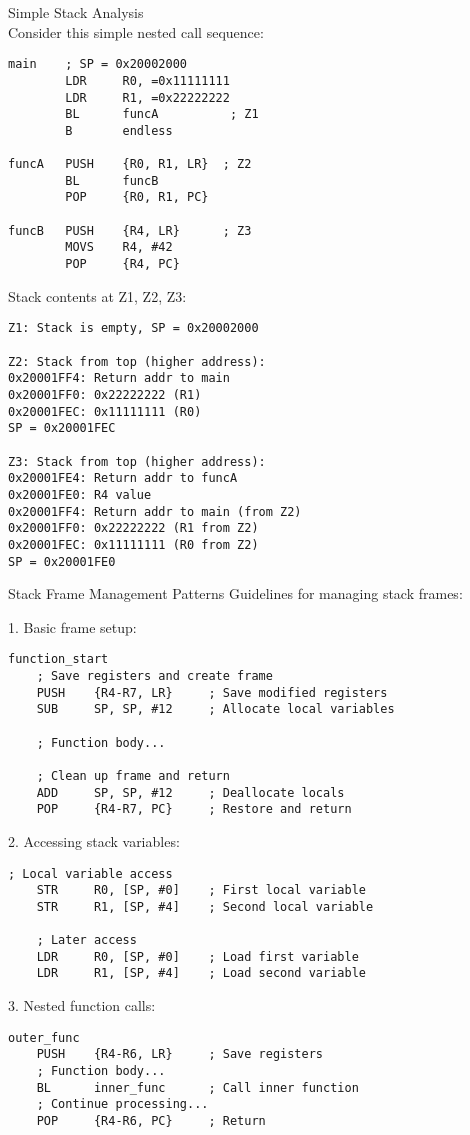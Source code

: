 \begin{example2}{Simple Stack Analysis}\\
Consider this simple nested call sequence:

\begin{lstlisting}[language=armasm, style=basesmol]
main    ; SP = 0x20002000
        LDR     R0, =0x11111111
        LDR     R1, =0x22222222
        BL      funcA          ; Z1
        B       endless

funcA   PUSH    {R0, R1, LR}  ; Z2
        BL      funcB
        POP     {R0, R1, PC}

funcB   PUSH    {R4, LR}      ; Z3
        MOVS    R4, #42
        POP     {R4, PC}
\end{lstlisting}

Stack contents at Z1, Z2, Z3:

\begin{lstlisting}[style=basesmol]
Z1: Stack is empty, SP = 0x20002000

Z2: Stack from top (higher address):           
0x20001FF4: Return addr to main
0x20001FF0: 0x22222222 (R1)
0x20001FEC: 0x11111111 (R0)
SP = 0x20001FEC

Z3: Stack from top (higher address):
0x20001FE4: Return addr to funcA
0x20001FE0: R4 value
0x20001FF4: Return addr to main (from Z2)
0x20001FF0: 0x22222222 (R1 from Z2)
0x20001FEC: 0x11111111 (R0 from Z2)
SP = 0x20001FE0
\end{lstlisting}
\end{example2}

\begin{KR}{Stack Frame Management Patterns}
Guidelines for managing stack frames:

1. Basic frame setup:
\begin{lstlisting}[language=armasm, style=basesmol]
function_start
    ; Save registers and create frame
    PUSH    {R4-R7, LR}     ; Save modified registers
    SUB     SP, SP, #12     ; Allocate local variables
    
    ; Function body...
    
    ; Clean up frame and return
    ADD     SP, SP, #12     ; Deallocate locals
    POP     {R4-R7, PC}     ; Restore and return
\end{lstlisting}

2. Accessing stack variables:
\begin{lstlisting}[language=armasm, style=basesmol]
    ; Local variable access
    STR     R0, [SP, #0]    ; First local variable
    STR     R1, [SP, #4]    ; Second local variable
    
    ; Later access
    LDR     R0, [SP, #0]    ; Load first variable
    LDR     R1, [SP, #4]    ; Load second variable
\end{lstlisting}

3. Nested function calls:
\begin{lstlisting}[language=armasm, style=basesmol]
outer_func
    PUSH    {R4-R6, LR}     ; Save registers
    ; Function body...
    BL      inner_func      ; Call inner function
    ; Continue processing...
    POP     {R4-R6, PC}     ; Return
\end{lstlisting}
\end{KR}

